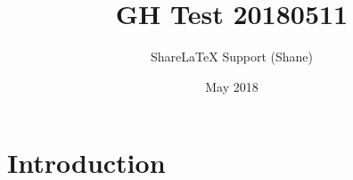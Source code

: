 \documentclass{article}
\title{GH Test 20180511}
\author{ShareLaTeX Support (Shane)}
\date{May 2018}
\begin{document}
\maketitle

\section{Introduction}
\end{document}
